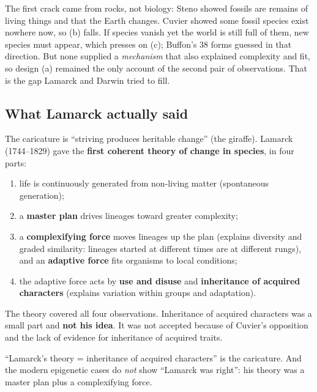 \begin{chain}
The first crack came from rocks, not biology: Steno showed fossils are remains of living things and that the Earth
changes. Cuvier showed some fossil species exist nowhere now, so (b) falls. If species vanish yet the world is still full
of them, new species must appear, which presses on (c); Buffon's 38 forms guessed in that direction. But none supplied a
\emph{mechanism} that also explained complexity and fit, so design (a) remained the only account of the second pair of
observations. That is the gap Lamarck and Darwin tried to fill.
\end{chain}

\subsection{What Lamarck actually said}
The caricature is ``striving produces heritable change'' (the giraffe). Lamarck (1744--1829) gave the \textbf{first
coherent theory of change in species}, in four parts:
\begin{enumerate}
\item life is continuously generated from non-living matter (spontaneous generation);
\item a \textbf{master plan} drives lineages toward greater complexity;
\item a \textbf{complexifying force} moves lineages up the plan (explains diversity and graded similarity: lineages
started at different times are at different rungs), and an \textbf{adaptive force} fits organisms to local conditions;
\item the adaptive force acts by \textbf{use and disuse} and \textbf{inheritance of acquired characters} (explains variation
within groups and adaptation).
\end{enumerate}
The theory covered all four observations. Inheritance of acquired characters was a small part and \textbf{not his idea}.
It was not accepted because of Cuvier's opposition and the lack of evidence for inheritance of acquired traits.

\begin{trap}
``Lamarck's theory = inheritance of acquired characters'' is the caricature. And the modern epigenetic cases do
\emph{not} show ``Lamarck was right'': his theory was a master plan plus a complexifying force.
\end{trap}

